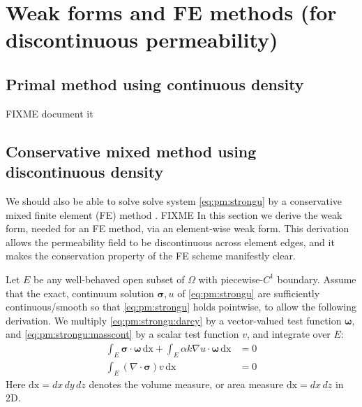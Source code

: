 \documentclass[11pt]{amsart}
\newcommand{\bsigma}{\bm{\sigma}}
\newcommand{\bomega}{\bm{\omega}}
\newcommand{\dx}{\mathrm{dx}}
\newcommand{\Div}{\nabla\cdot}
\newcommand{\grad}{\nabla}
\begin{document}
\section{Weak forms and FE methods (for discontinuous permeability)}

\subsection{Primal method using continuous density}  FIXME document it

\subsection{Conservative mixed method using discontinuous density}  We should also be able to solve solve system \eqref{eq:pm:strongu} by a conservative mixed finite element (FE) method \citep{Boffi2013}.  FIXME In this section we derive the weak form, needed for an FE method, via an element-wise weak form.  This derivation allows the permeability field to be discontinuous across element edges, and it makes the conservation property of the FE scheme manifestly clear.

Let $E$ be any well-behaved open subset of $\Omega$ with piecewise-$C^1$ boundary.  Assume that the exact, continuum solution $\bsigma,u$ of \eqref{eq:pm:strongu} are sufficiently continuous/smooth so that \eqref{eq:pm:strongu} holds pointwise, to allow the following derivation.  We multiply \eqref{eq:pm:strongu:darcy} by a vector-valued test function $\bomega$, and \eqref{eq:pm:strongu:masscont} by a scalar test function $v$, and integrate over $E$:
\begin{subequations}
\label{eq:pm:elementweak}
\begin{align}
\int_E \bsigma\cdot \bomega\,\dx + \int_E \alpha k \grad u \cdot \bomega\,\dx &= 0 \label{eq:pm:elementweak:darcy} \\
\int_E (\Div \bsigma) v\,\dx &= 0 \label{eq:pm:elementweak:masscont}
\end{align}
\end{subequations}
Here $\dx = dx\,dy\,dz$ denotes the volume measure, or area measure $\dx = dx\,dz$ in 2D.
\end{document}
